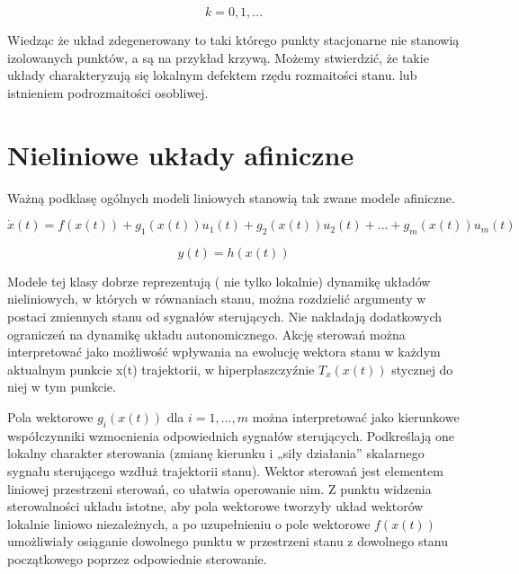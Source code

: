 \documentclass{article}
\begin{document}
		\begin{equation}
			k = 0, 1, ...
		\end{equation}
		
		Wiedząc że układ zdegenerowany to taki którego punkty stacjonarne nie 
		stanowią izolowanych punktów, a są na przykład krzywą. Możemy stwierdzić,
		że takie układy charakteryzują się lokalnym defektem rzędu rozmaitości stanu.
		lub istnieniem podrozmaitości osobliwej.

		\section{Nieliniowe układy afiniczne}

		Ważną podklasę ogólnych modeli liniowych stanowią tak zwane modele afiniczne.

		\begin{equation}
			\dot{x}(t) = f(x(t)) + g_1(x(t))u_1(t) + g_2(x(t))u_2(t) + ...
			+ g_m(x(t))u_m(t) 
		\end{equation}

		\begin{equation}
			y(t) = h(x(t))
		\end{equation}

		Modele tej klasy dobrze reprezentują ( nie tylko lokalnie) dynamikę 
		układów nieliniowych, w których w równaniach stanu, można rozdzielić argumenty
		w postaci zmiennych stanu od sygnałów sterujących. Nie nakładają dodatkowych 
		ograniczeń na dynamikę układu autonomicznego. Akcję sterowań można interpretować
		jako możliwość wpływania na ewolucję wektora stanu w każdym aktualnym punkcie x(t)
		trajektorii, w hiperpłaszczyźnie $T_x(x(t))$ stycznej do niej w tym punkcie.
		
		Pola wektorowe $g_i(x(t))$  dla $i= 1, ... , m$ można
		interpretować jako kierunkowe współczynniki wzmocnienia odpowiednich sygnałów
		sterujących. Podkreślają one lokalny charakter sterowania (zmianę kierunku i „siły działania”
		skalarnego sygnału sterującego wzdłuż trajektorii stanu). Wektor sterowań jest elementem
		liniowej przestrzeni sterowań, co ułatwia operowanie nim. Z punktu widzenia sterowalności
		układu istotne, aby pola wektorowe tworzyły układ wektorów lokalnie liniowo niezależnych,
		a po uzupełnieniu o pole wektorowe $f(x(t))$
		umożliwiały osiąganie dowolnego punktu w
		przestrzeni stanu z dowolnego stanu początkowego poprzez odpowiednie sterowanie.
\end{document}
